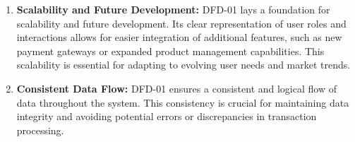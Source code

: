 \documentclass[a4paper,12pt]{article}
\begin{document}
\begin{enumerate}
  \item \textbf{Scalability and Future Development:} DFD-01 lays a foundation for scalability and future development. Its clear representation of user roles and interactions allows for easier integration of additional features, such as new payment gateways or expanded product management capabilities. This scalability is essential for adapting to evolving user needs and market trends.

  \item \textbf{Consistent Data Flow:} DFD-01 ensures a consistent and logical flow of data throughout the system. This consistency is crucial for maintaining data integrity and avoiding potential errors or discrepancies in transaction processing.

\end{enumerate}
\end{document}

